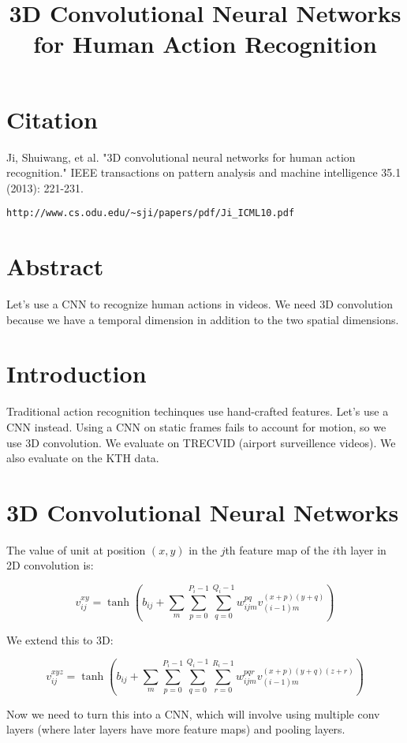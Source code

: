 \documentclass[a4paper]{article}
\title{3D Convolutional Neural Networks for Human Action Recognition}
\date{}
\begin{document}
\maketitle

\section{Citation}
Ji, Shuiwang, et al. "3D convolutional neural networks for human action recognition." IEEE transactions on pattern analysis and machine intelligence 35.1 (2013): 221-231.

\begin{verbatim}
http://www.cs.odu.edu/~sji/papers/pdf/Ji_ICML10.pdf
\end{verbatim}

\section{Abstract}
Let's use a CNN to recognize human actions in videos. We need 3D convolution
because we have a temporal dimension in addition to the two spatial dimensions.

\section{Introduction}
Traditional action recognition techinques use hand-crafted features. Let's use
a CNN instead. Using a CNN on static frames fails to account for motion, so we
use 3D convolution. We evaluate on TRECVID (airport surveillence videos). We
also evaluate on the KTH data.

\section{3D Convolutional Neural Networks}
The value of unit at position $(x, y)$ in the $j$th feature map of the $i$th
layer in 2D convolution is:

$$
v_{ij}^{xy} = \tanh(b_{ij} + 
\sum_{m}{\sum_{p=0}^{P_i - 1}{\sum_{q = 0}^{Q_i - 1}{
  w_{ijm}^{pq} v_{(i-1)m}^{(x+p)(y+q)}
}}})
$$

We extend this to 3D:

$$
v_{ij}^{xyz} = \tanh(b_{ij} + 
\sum_{m}{\sum_{p=0}^{P_i - 1}{\sum_{q = 0}^{Q_i - 1}{\sum_{r=0}^{R_i - 1}{
  w_{ijm}^{pqr} v_{(i-1)m}^{(x+p)(y+q)(z+r)}
}}}})
$$

Now we need to turn this into a CNN, which will involve using multiple conv
layers (where later layers have more feature maps) and pooling layers.
\end{document}
